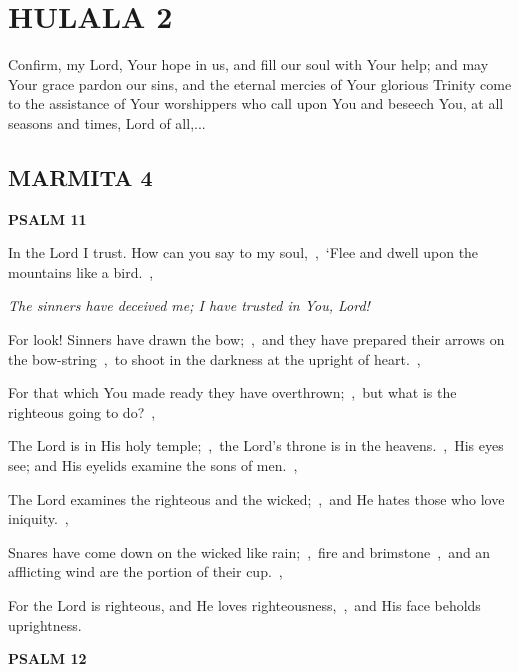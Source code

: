 \documentclass[12pt,twoside,a5paper]{article}
\newcommand{\hulala}[1]{\section*{HULALA {#1}}}
\newcommand{\marmita}[1]{\subsection*{MARMITA {#1}}}
\newcommand{\psalm}[1]{\textbf{PSALM {#1}}}
\newcommand{\qanona}[1]{{\liturgicalhint{Qanona.} \emph{#1}}}
\newcommand{\slota}[1]{\liturgicalhint{Slota.} #1}
\begin{document}

\hulala{2}

\slota{Confirm, my Lord, Your hope in us, and fill our soul with Your help; and may Your grace pardon our sins, and the eternal mercies of Your glorious Trinity come to the assistance of Your worshippers who call upon You and beseech You, at all seasons and times, Lord of all,...}

\marmita{4}

\psalm{11}

\begin{normalparskip}
  In the Lord I trust. How can you say to my soul,~\sep\ ‘Flee and dwell upon the mountains like a bird.~\sep

  \qanona{The sinners have deceived me; I have trusted in You, Lord!}

  For look! Sinners have drawn the bow;~\sep\ and they have prepared their arrows on the bow-string~\sep\ to shoot in the darkness at the upright of heart.~\sep

  For that which You made ready they have overthrown;~\sep\ but what is the righteous going to do?~\sep

  The Lord is in His holy temple;~\sep\ the Lord's throne is in the heavens.~\sep\ His eyes see; and His eyelids examine the sons of men.~\sep

  The Lord examines the righteous and the wicked;~\sep\ and He hates those who love iniquity.~\sep

  Snares have come down on the wicked like rain;~\sep\ fire and brimstone~\sep\ and an afflicting wind are the portion of their cup.~\sep

  For the Lord is righteous, and He loves righteousness,~\sep\ and His face beholds uprightness.
\end{normalparskip}

\psalm{12}
\end{document}
